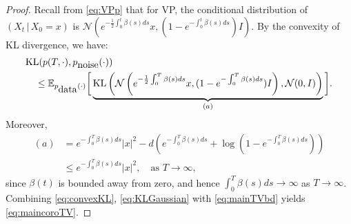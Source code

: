 \documentclass[10pt,a4paper]{amsart}
\begin{document}
\begin{proof}
Recall from \eqref{eq:VPp} that 
for VP,
the conditional distribution of $(X_t \,|\, X_0 = x)$ is
$\mathcal{N} \left( e^{-\frac{1}{2} \int_0^t \beta(s) ds} x, (1 - e^{-\int_0^t \beta(s) ds}) I  \right)$.
By the convexity of KL divergence,
we have:
\begin{equation}
\label{eq:convexKL}
\begin{aligned}
& \mbox{KL}(p(T, \cdot), p_{\tiny \mbox{noise}}(\cdot)) \\
& \quad \le \mathbb{E}_{p_{\tiny \mbox{data}}(\cdot)}
\bigg[\underbrace{\mbox{KL}\left( \mathcal{N} \left( e^{-\frac{1}{2} \int_0^T \beta(s) ds} x, (1 - e^{-\int_0^T \beta(s) ds}) I  \right), \mathcal{N}(0, I)\right)}_{(a)}\bigg].
\end{aligned}
\end{equation}
Moreover,
\begin{equation}
\label{eq:KLGaussian}
\begin{aligned}
(a) &= e^{- \int_0^T \beta(s) ds} |x|^2 - d \left( e^{-\int_0^T \beta(s) ds} + \log (1 - e^{-\int_0^T \beta(s) ds}) \right) \\
& \le e^{- \int_0^T \beta(s) ds} |x|^2, \quad \mbox{as } T \to \infty,
\end{aligned}
\end{equation}
since $\beta(t)$ is bounded away from zero, 
and hence $\int_0^T \beta(s) ds \to \infty$ as $T \to \infty$.
Combining \eqref{eq:convexKL}, \eqref{eq:KLGaussian} with \eqref{eq:mainTVbd} yields \eqref{eq:maincoroTV}.
\end{proof}
\end{document}
